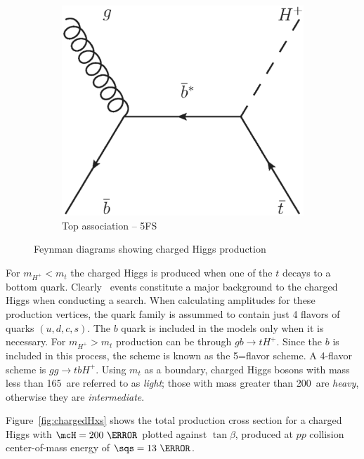 \begin{figure}[!h]
\begin{subfigure}{0.3\textwidth}
   \includegraphics[width=\textwidth]{figures/feynmanIIa.eps}
\caption{Top association -- 5FS}
\end{subfigure} %
\caption{Feynman diagrams showing charged Higgs production}
\label{fig:chargedFeyn}
\end{figure}

\par For $m_{H^{+}}<m_t$ the charged Higgs is produced when one of the $t$ decays to a bottom quark. 
Clearly \ttbar\ events constitute a major background to the charged Higgs when conducting a search. 
When calculating amplitudes for these production vertices, the quark family is assummed to contain just 4
flavors of quarks $(u,d,c,s)$. The $b$ quark is included in the models only when it is necessary. 
For $m_{H^{+}}>m_t$ production can be through $gb\rightarrow tH^+$. Since the $b$ is included in this 
process, the scheme is known as the 5=flavor scheme. A 4-flavor scheme is $gg\rightarrow tbH^+$. 
Using $m_t$ as a boundary, charged Higgs bosons with mass less than 165~\GeV are referred to as {\it light}; 
those with mass greater than 200~\GeV are {\it heavy}, otherwise they are {\it intermediate}.

\par Figure~\ref{fig:chargedHxs} shows the total production cross section for a charged Higgs with 
$\mcH=200~\GeV$ plotted against $\tan\beta$, produced at $pp$ collision center-of-mass energy of $\sqs=13~\TeV$. 

